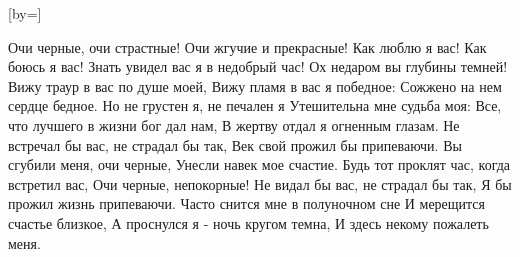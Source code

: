 [by={}]

\beginverse
Очи черные, очи страстные! 
Очи жгучие и прекрасные! 
Как люблю я вас! Как боюсь я вас! 
Знать увидел вас я в недобрый час! 
\endverse
\beginverse
Ох недаром вы глубины темней! 
Вижу траур в вас по душе моей, 
Вижу пламя в вас я победное: 
Сожжено на нем сердце бедное. 
\endverse
\beginverse
Но не грустен я, не печален я 
Утешительна мне судьба моя: 
Все, что лучшего в жизни бог дал нам, 
В жертву отдал я огненным глазам. 
\endverse
\beginverse
Не встречал бы вас, не страдал бы так, 
Век свой прожил бы припеваючи. 
Вы сгубили меня, очи черные, 
Унесли навек мое счастие.  
\endverse
\beginverse
Будь тот проклят час, когда встретил вас, 
Очи черные, непокорные! 
Не видал бы вас, не страдал бы так, 
Я бы прожил жизнь припеваючи. 
\endverse
\beginverse
Часто снится мне в полуночном сне 
И мерещится счастье близкое, 
А проснулся я - ночь кругом темна, 
И здесь некому пожалеть меня.
\endverse
\endsong 	
